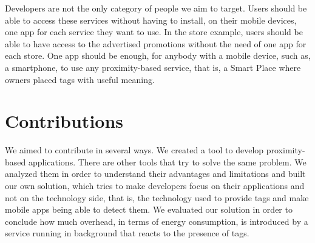 Developers are not the only category of people we aim to target.
Users should be able to access these services without having to install, on their mobile devices, one app for each service they want to use.
In the store example, users should be able to have access to the advertised promotions without the need of one app for each store.
One app should be enough, for anybody with a mobile device, such as, a smartphone, to use any proximity-based service, that is, a Smart Place where owners placed tags with useful meaning.

\section{Contributions}
\label{sec:introduction_contributions}
We aimed to contribute in several ways.
We created a tool to develop proximity-based applications.
There are other tools that try to solve the same problem.
We analyzed them in order to understand their advantages and limitations and built our own solution, which tries to make developers focus on their applications and not on the technology side, that is, the technology used to provide tags and make mobile apps being able to detect them.
We evaluated our solution in order to conclude how much overhead, in terms of energy consumption, is introduced by a service running in background that reacts to the presence of tags.



